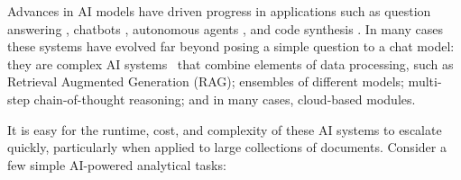 





Advances in AI models have driven progress in applications such as question answering \cite{zhang2024endtoend}, chatbots \cite{vicuna2023}, autonomous agents \cite{patil2023gorilla,schick2023toolformer}, and code synthesis \cite{Li_2022,hong2023metagpt}. In many cases these systems have evolved far beyond posing a simple question to a chat model: they are  complex AI systems~\cite{compound-ai-blog} that combine elements of data processing, such as Retrieval Augmented Generation (RAG); ensembles of different models; multi-step chain-of-thought reasoning; and in many cases, cloud-based modules.

It is easy for the runtime, cost, and complexity of these AI systems to escalate quickly, particularly when applied to large collections of documents. Consider a few simple AI-powered analytical tasks:

